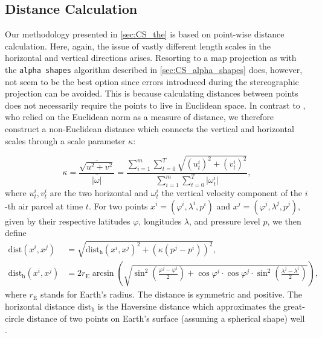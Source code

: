 \subsection{Distance Calculation}\label{sec:CS_dist}
Our methodology presented in \cref{sec:CS_the} is based on point-wise distance calculation. Here, again, the issue of vastly different length scales in the horizontal and vertical directions arises. Resorting to a map projection as with the \texttt{alpha shapes} algorithm described in \cref{sec:CS_alpha_shapes} does, however, not seem to be the best option since errors introduced during the stereographic projection can be avoided. This is because calculating distances between points does not necessarily require the points to live in Euclidean space. In contrast to \textcite{banischUnderstandingGeometryTransport2017}, who relied on the Euclidean norm as a measure of distance, we therefore construct a non-Euclidean distance which connects the vertical and horizontal scales through a scale parameter $\kappa$:

\begin{equation}
    \kappa = \frac{\overline{\sqrt{u^2 + v^2}}}{\overline{\vert\omega\vert}}  = \frac{\sum_{i=1}^m \sum_{t=0}^T \sqrt{(u^i_t)^2 + (v^i_t)^2}}{\sum_{i=1}^m \sum_{t=0}^T \vert \omega^i_t\vert},\label{eqn:k}
\end{equation}
where $u^i_t,v^i_t$ are the two horizontal and $\omega^i_t$ the vertical velocity component of the $i$-th air parcel at time $t$. For two points $x^i = (\varphi^i,\lambda^i,p^i)$ and $x^j = (\varphi^j,\lambda^j,p^j)$, given by their respective latitudes $\varphi$, longitudes $\lambda$, and pressure level $p$, we then define
\begin{align*}
    \text{dist} (x^i, x^j)           & = \sqrt{\text{dist}_\mathrm{h}(x^i, x^j)^2 + (\kappa(p^j - p^i))^2},                                                                                                                            \\
    \text{dist}_\mathrm{h}(x^i, x^j) & = 2r_{\mathrm{E}} \arcsin\left(\sqrt{\sin^2\left(\frac{\varphi^j - \varphi^i}{2}\right) + \cos \varphi^i \cdot \cos \varphi^j \cdot \sin^2\left(\frac{\lambda^j - \lambda^i}{2}\right)}\right),
\end{align*}
where $r_{\mathrm{E}}$ stands for Earth's radius.
The distance is symmetric and positive. The horizontal distance $\text{dist}_\mathrm{h}$ is the Haversine distance which approximates the great-circle distance of two points on Earth's surface (assuming a spherical shape) well \parencite{greenSphericalTrigonometry1977}.

